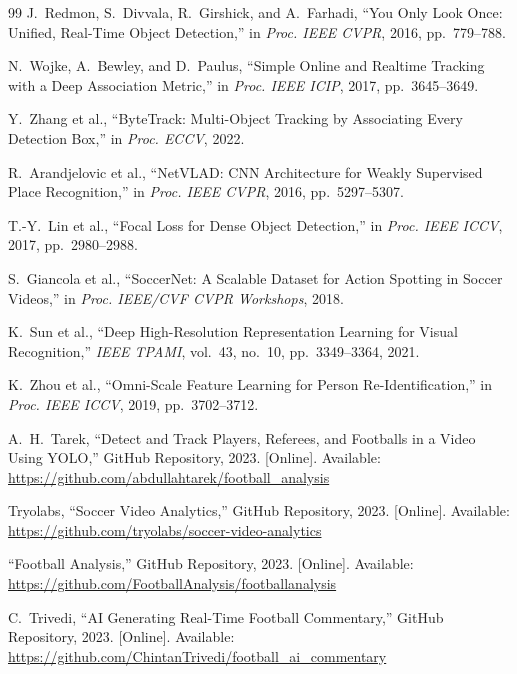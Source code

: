\documentclass[10pt,twocolumn,a4paper]{article}
\begin{document}

\begin{thebibliography}{99}
J.~Redmon, S.~Divvala, R.~Girshick, and A.~Farhadi, ``You Only Look Once: Unified, Real-Time Object Detection,'' in \textit{Proc. IEEE CVPR}, 2016, pp.~779--788.

N.~Wojke, A.~Bewley, and D.~Paulus, ``Simple Online and Realtime Tracking with a Deep Association Metric,'' in \textit{Proc. IEEE ICIP}, 2017, pp.~3645--3649.

Y.~Zhang et al., ``ByteTrack: Multi-Object Tracking by Associating Every Detection Box,'' in \textit{Proc. ECCV}, 2022.

R.~Arandjelovic et al., ``NetVLAD: CNN Architecture for Weakly Supervised Place Recognition,'' in \textit{Proc. IEEE CVPR}, 2016, pp.~5297--5307.

T.-Y.~Lin et al., ``Focal Loss for Dense Object Detection,'' in \textit{Proc. IEEE ICCV}, 2017, pp.~2980--2988.

S.~Giancola et al., ``SoccerNet: A Scalable Dataset for Action Spotting in Soccer Videos,'' in \textit{Proc. IEEE/CVF CVPR Workshops}, 2018.

K.~Sun et al., ``Deep High-Resolution Representation Learning for Visual Recognition,'' \textit{IEEE TPAMI}, vol.~43, no.~10, pp.~3349--3364, 2021.

K.~Zhou et al., ``Omni-Scale Feature Learning for Person Re-Identification,'' in \textit{Proc. IEEE ICCV}, 2019, pp.~3702--3712.

A.~H.~Tarek, ``Detect and Track Players, Referees, and Footballs in a Video Using YOLO,'' GitHub Repository, 2023. [Online]. Available: \url{https://github.com/abdullahtarek/football_analysis}

Tryolabs, ``Soccer Video Analytics,'' GitHub Repository, 2023. [Online]. Available: \url{https://github.com/tryolabs/soccer-video-analytics}

``Football Analysis,'' GitHub Repository, 2023. [Online]. Available: \url{https://github.com/FootballAnalysis/footballanalysis}

C.~Trivedi, ``AI Generating Real-Time Football Commentary,'' GitHub Repository, 2023. [Online]. Available: \url{https://github.com/ChintanTrivedi/football_ai_commentary}


\end{thebibliography}
\end{document}
